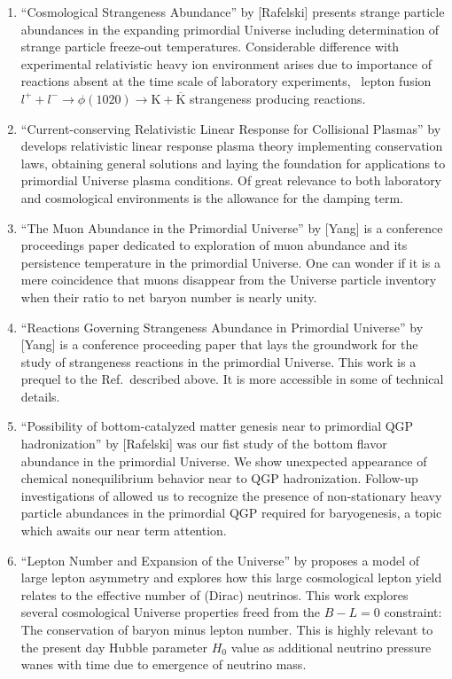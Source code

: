 \begin{enumerate}
%
\item ``Cosmological Strangeness Abundance'' by [Rafelski] presents strange particle abundances in the expanding primordial Universe including determination of strange particle freeze-out temperatures. {\color{black} Considerable difference with experimental relativistic heavy ion environment arises due to importance of reactions absent at the time scale of laboratory experiments, \eg\ lepton fusion $l^+ +l^-\to\phi(1020)\to \mathrm{K}+\overline{\mathrm K}$ strangeness producing reactions.}
\item ``Current-conserving Relativistic Linear Response for Collisional Plasmas'' by  develops relativistic linear response plasma theory implementing conservation laws, obtaining general solutions and laying the foundation for applications to primordial Universe plasma conditions. {\color{black} Of great relevance to both laboratory and cosmological environments is the allowance for the damping term.}
%
\item ``The Muon Abundance in the Primordial Universe'' by [Yang] is a conference proceedings paper dedicated to exploration of muon abundance and its persistence temperature in the primordial Universe. {\color{black} One can wonder if it is a mere coincidence that muons disappear from the Universe particle inventory when their ratio to net baryon number is nearly unity.}
%
\item ``Reactions Governing Strangeness Abundance in Primordial Universe'' by [Yang] is a conference proceeding paper that lays the groundwork for the study of strangeness reactions in the primordial Universe. {\color{black} This work is a prequel to the Ref.\,\cite{Yang:2021bko} described above. It is more accessible in some of technical details.}
%
\item ``Possibility of bottom-catalyzed matter genesis near to primordial QGP hadronization'' by [Rafelski] was our fist study of the bottom flavor abundance in the primordial Universe. {\color{black} We show unexpected appearance of chemical nonequilibrium behavior near to QGP hadronization. Follow-up investigations of allowed us to recognize the presence of non-stationary heavy particle abundances in the primordial QGP required for baryogenesis, a topic which awaits our near term attention.}
%
\item ``Lepton Number and Expansion of the Universe'' by  proposes a model of large lepton asymmetry and explores how this large cosmological lepton yield relates to the effective number of (Dirac) neutrinos. {\color{black} This work explores several cosmological Universe properties freed from the $B-L=0$ constraint: The conservation of baryon minus lepton number. This is highly relevant to the present day Hubble parameter $H_0$ value as additional neutrino pressure wanes with time due to emergence of neutrino mass.}

\end{enumerate}
